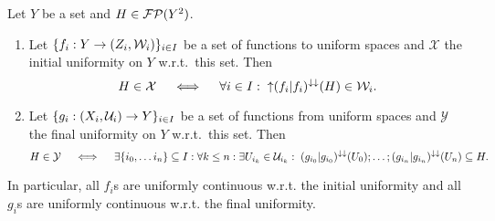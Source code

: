 \begin{proposition} \label{initialFinalUniformity}
Let $Y$ be a set and $H\in\operatorname{\mathcal{FP}}(Y^2)$.
\begin{enumerate}
\item Let $\{f_i: Y\to \sSet{Z_i, \mathcal{W}_i}\}_{i\in I}$ be a set of functions to uniform spaces and $\mathcal{X}$ the initial uniformity on $Y$ w.r.t.\ this set. Then
\[ H\in \mathcal{X} \quad\iff\quad \forall i\in I: \; \operatorname{\uparrow}(f_i|f_i)^{\downarrow\downarrow}(H)\in \mathcal{W}_i. \]
\item Let $\{g_i: \sSet{X_i, \mathcal{U}_i}\to Y\}_{i\in I}$ be a set of functions from uniform spaces and $\mathcal{Y}$ the final uniformity on $Y$ w.r.t.\ this set. Then
\[ H\in \mathcal{Y} \quad\iff\quad \exists \{i_0,\ldots i_n\}\subseteq I: \forall k\leq n: \exists U_{i_k}\in \mathcal{U}_{i_k}:\; (g_{i_0}|g_{i_0})^{\downarrow\downarrow}(U_0);\ldots;(g_{i_n}|g_{i_n})^{\downarrow\downarrow}(U_n)\subseteq H. \]
\end{enumerate}
\end{proposition}
In particular, all $f_i$s are uniformly continuous w.r.t. the initial uniformity and all $g_i$s are uniformly continuous w.r.t. the final uniformity.

